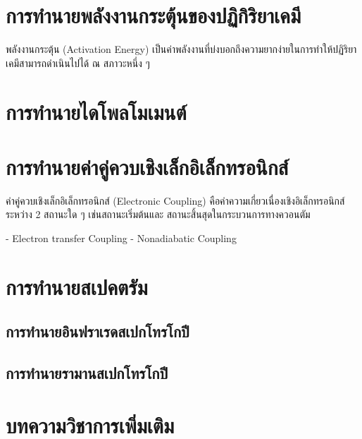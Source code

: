 \section{การทำนายพลังงานกระตุ้นของปฏิกิริยาเคมี}

พลังงานกระตุ้น (Activation Energy) เป็นค่าพลังงานที่บ่งบอกถึงความยากง่ายในการทำให้ปฏิริยาเคมีสามารถดำเนินไปได้ ณ สภาวะหนึ่ง ๆ

\section{การทำนายไดโพลโมเมนต์}

\section{การทำนายค่าคู่ควบเชิงเล็กอิเล็กทรอนิกส์}

ค่าคู่ควบเชิงเล็กอิเล็กทรอนิกส์ (Electronic Coupling) คือค่าความเกี่ยวเนื่องเชิงอิเล็กทรอนิกส์ระหว่าง 2 สถานะใด ๆ เช่นสถานะเริ่มต้นและ%
สถานะสิ้นสุดในกระบวนการทางควอนตัม

- Electron transfer Coupling
- Nonadiabatic Coupling

\section{การทำนายสเปคตรัม}

\subsection{การทำนายอินฟราเรดสเปกโทรโกปี}

\subsection{การทำนายรามานสเปกโทรโกปี}

\section{บทความวิชาการเพิ่มเติม}

